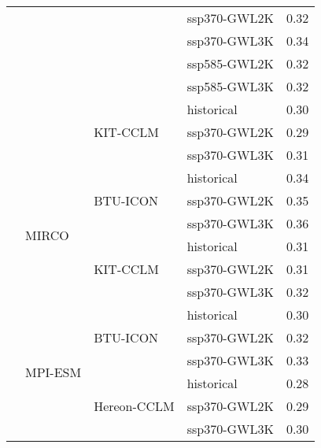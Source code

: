 \begin{table}[!htbp]
\begin{tabular}{lll|l|r}
 &  &  & ssp370-GWL2K & 0.32 \\
 &  &  & ssp370-GWL3K & 0.34 \\
 &  &  & ssp585-GWL2K & 0.32 \\
 &  &  & ssp585-GWL3K & 0.32 \\
\cmidrule(lr){3-5}
 &  & \multirow{3}{*}{KIT-CCLM} & historical & 0.30 \\
 &  &  & ssp370-GWL2K & 0.29 \\
 &  &  & ssp370-GWL3K & 0.31 \\
\cmidrule(lr){3-5}
\cmidrule(lr){2-5}
 & \multirow{6}{*}{MIRCO} & \multirow{3}{*}{BTU-ICON} & historical & 0.34 \\
 &  &  & ssp370-GWL2K & 0.35 \\
 &  &  & ssp370-GWL3K & 0.36 \\
\cmidrule(lr){3-5}
 &  & \multirow{3}{*}{KIT-CCLM} & historical & 0.31 \\
 &  &  & ssp370-GWL2K & 0.31 \\
 &  &  & ssp370-GWL3K & 0.32 \\
\cmidrule(lr){3-5}
\cmidrule(lr){2-5}
 & \multirow{6}{*}{MPI-ESM} & \multirow{3}{*}{BTU-ICON} & historical & 0.30 \\
 &  &  & ssp370-GWL2K & 0.32 \\
 &  &  & ssp370-GWL3K & 0.33 \\
\cmidrule(lr){3-5}
 &  & \multirow{3}{*}{Hereon-CCLM} & historical & 0.28 \\
 &  &  & ssp370-GWL2K & 0.29 \\
 &  &  & ssp370-GWL3K & 0.30 \\
\bottomrule
\end{tabular}
\end{table}
